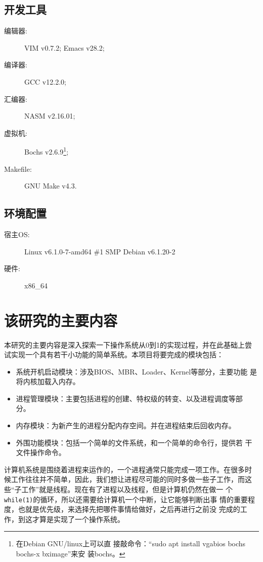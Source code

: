 \subsection{开发工具}

\begin{description}
\item[编辑器:] VIM v0.7.2; Emacs v28.2;
\item[编译器:] GCC v12.2.0;
\item[汇编器:] NASM v2.16.01;
\item[虚拟机:] Bochs v2.6.9\footnote{在Debian GNU/linux上可以直
    接敲命令：“sudo apt install vgabios bochs bochs-x bximage”来安
    装bochs。};
\item[Makefile:] GNU Make v4.3.
\end{description}

\subsection{环境配置}

\begin{description}
\item[宿主OS:] Linux v6.1.0-7-amd64 \#1 SMP Debian v6.1.20-2
\item[硬件:] x86\_64
\end{description}

\section{该研究的主要内容}

本研究的主要内容是深入探索一下操作系统从0到1的实现过程，并在此基础上尝
试实现一个具有若干小功能的简单系统。本项目将要完成的模块包括：
\begin{itemize}
\item 系统开机启动模块：涉及BIOS、MBR、Loader、Kernel等部分，主要功能
  是将内核加载入内存。
\item 进程管理模块：主要包括进程的创建、特权级的转变、以及进程调度等部
  分。
\item 内存模块：为新产生的进程分配内存空间。并在进程结束后回收内存。
\item 外围功能模块：包括一个简单的文件系统，和一个简单的命令行，提供若
  干文件操作命令。
\end{itemize}

计算机系统是围绕着进程来运作的，一个进程通常只能完成一项工作。在很多时
候工作往往并不简单，因此，我们想让进程尽可能的同时多做一些子工作，而这
些“子工作”就是线程。现在有了进程以及线程，但是计算机仍然在做一
个\texttt{while(1)}的循环，所以还需要给计算机一个中断，让它能够判断出事
情的重要程度，也就是优先级，来选择先把哪件事情给做好，之后再进行之前没
完成的工作，到这才算是实现了一个操作系统\cite{yy2009}。


